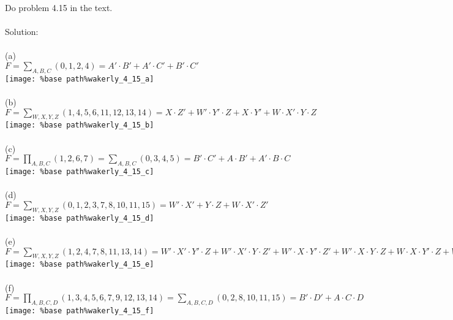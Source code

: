 Do problem 4.15 in the text.\\ \\

Solution: \\ \\
(a)\\
$F=\sum_{A,B,C}(0,1,2,4)=A' \cdot B' + A' \cdot C' + B' \cdot C'$\\
\texttt{[image: \%base path\%wakerly\_4\_15\_a]}\\ \\
(b)\\
$F=\sum_{W,X,Y,Z}(1,4,5,6,11,12,13,14)=X \cdot Z' + W' \cdot Y' \cdot Z + X \cdot Y'+ W \cdot X' \cdot Y \cdot Z$\\
\texttt{[image: \%base path\%wakerly\_4\_15\_b]}\\ \\
(c)\\
$F=\prod_{A,B,C}(1,2,6,7)=\sum_{A,B,C}(0,3,4,5)=B' \cdot C' + A \cdot B' + A' \cdot B \cdot C$\\
\texttt{[image: \%base path\%wakerly\_4\_15\_c]}\\ \\
(d)\\
$F=\sum_{W,X,Y,Z}(0,1,2,3,7,8,10,11,15)=W' \cdot X' + Y \cdot Z + W \cdot X' \cdot Z'$\\
\texttt{[image: \%base path\%wakerly\_4\_15\_d]}\\ \\
(e)\\
$F=\sum_{W,X,Y,Z}(1,2,4,7,8,11,13,14)=W' \cdot X' \cdot Y' \cdot Z + W' \cdot X' \cdot Y \cdot Z' + W' \cdot X \cdot Y' \cdot Z' + W' \cdot X \cdot Y \cdot Z + W \cdot X \cdot Y' \cdot Z + W \cdot X \cdot Y \cdot Z' + W \cdot X' \cdot Y' \cdot Z' + W \cdot X' \cdot Y \cdot Z$\\
\texttt{[image: \%base path\%wakerly\_4\_15\_e]}\\ \\
(f)\\
$F=\prod_{A,B,C,D}(1,3,4,5,6,7,9,12,13,14)=\sum_{A,B,C,D}(0,2,8,10,11,15)=B' \cdot D' + A \cdot C \cdot D$\\
\texttt{[image: \%base path\%wakerly\_4\_15\_f]}\\ \\
